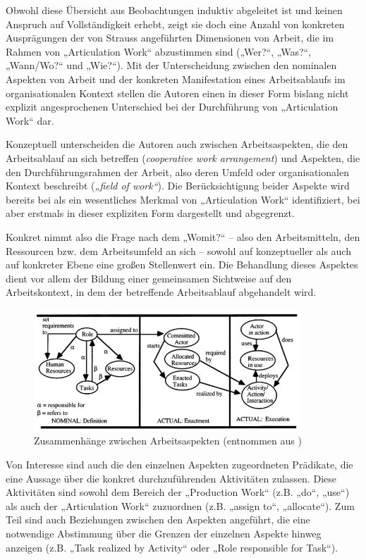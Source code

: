 Obwohl diese Übersicht aus Beobachtungen induktiv abgeleitet ist und keinen Anspruch auf Vollständigkeit erhebt, zeigt sie doch eine Anzahl von konkreten Ausprägungen der von Strauss angeführten Dimensionen von Arbeit, die im Rahmen von „Articulation Work“ abzustimmen sind („Wer?“, „Was?“, „Wann/Wo?“ und „Wie?“). Mit der Unterscheidung zwischen den nominalen Aspekten von Arbeit und der konkreten Manifestation eines Arbeitsablaufs im organisationalen Kontext stellen die Autoren einen in dieser Form bislang nicht explizit angesprochenen Unterschied bei der Durchführung von „Articulation Work“ dar.

Konzeptuell unterscheiden die Autoren auch zwischen Arbeitsaspekten, die den Arbeitsablauf an sich betreffen (\emph{cooperative work arrangement}) und Aspekten, die den Durchführungsrahmen der Arbeit, also deren Umfeld oder organisationalen Kontext beschreibt (\emph{„field of work“}). Die Berücksichtigung beider Aspekte wird bereits bei \citet{Strauss88} als ein wesentliches Merkmal von „Articulation Work“ identifiziert, bei \citet{Schmidt96} aber erstmals in dieser expliziten Form dargestellt und abgegrenzt.

Konkret nimmt also die Frage nach dem „Womit?“ -- also den Arbeitsmitteln, den Ressourcen bzw. dem Arbeitsumfeld an sich --  sowohl auf konzeptueller als auch auf konkreter Ebene eine großen Stellenwert ein. Die Behandlung dieses Aspektes dient vor allem der Bildung einer gemeinsamen Sichtweise auf den Arbeitskontext, in dem der betreffende Arbeitsablauf abgehandelt wird.

\begin{figure}[htbp]
	\centering
		\includegraphics[width=10cm]{img/ArticulationWork/divitini00_caw.png}
	\caption[Zusammenhänge zwischen Arbeitsaspekten]{Zusammenhänge zwischen Arbeitsaspekten (entnommen aus \citep{Divitini00})}
	\label{fig:img_ArticulationWork_divitini00_caw}
\end{figure}

Von Interesse sind auch die den einzelnen Aspekten zugeordneten Prädikate, die eine Aussage über die konkret durchzuführenden Aktivitäten zulassen. Diese Aktivitäten sind sowohl dem Bereich der „Production Work“ (z.B. „do“, „use“) als auch der „Articulation Work“ zuzuordnen (z.B. „assign to“, „allocate“). Zum Teil sind auch Beziehungen zwischen den Aspekten angeführt, die eine notwendige Abstimmung über die Grenzen der einzelnen Aspekte hinweg anzeigen (z.B. „Task realized by Activity“ oder „Role responsible for Task“).

